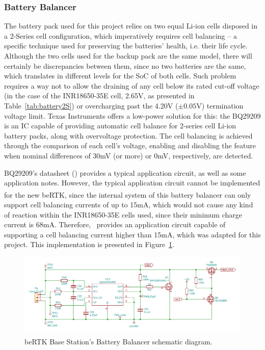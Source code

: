 \subsubsection{Battery Balancer}\label{sec:3212_BQ29209}

The battery pack used for this project relies on two equal Li-ion cells disposed in a 2-Series cell configuration, which imperatively requires cell balancing -- a specific technique used for preserving the batteries' health, i.e. their life cycle. Although the two cells used for the backup pack are the same model, there will certainly be discrepancies between them, since no two batteries are the same, which translates in different levels for the \gls{SoC} of both cells. Such problem requires a way not to allow the draining of any cell below its rated cut-off voltage (in the case of the INR18650-35E cell, 2.65V, as presented in Table~\ref{tab:battery2S}) or overcharging past the 4.20V ($\pm0.05$V) termination voltage limit. Texas Instruments offers a low-power solution for this: the BQ29209 is an IC capable of providing automatic cell balance for 2-series cell Li-ion battery packs, along with overvoltage protection. The cell balancing is achieved through the comparison of each cell's voltage, enabling and disabling the feature when nominal differences of 30mV (or more) or 0mV, respectively, are detected.

BQ29209's datasheet (\cite{bq29209}) provides a typical application circuit, as well as some application notes. However, the typical application circuit cannot be implemented for the new beRTK\textsuperscript{\textregistered}, since the internal system of this battery balancer can only support cell balancing currents of up to 15mA, which would not cause any kind of reaction within the INR18650-35E cells used, since their minimum charge current is 68mA. Therefore,~\cite{bq29209} provides an application circuit capable of supporting a cell balancing current higher than 15mA, which was adapted for this project. This implementation is presented in Figure~\ref{fig:BQ29209_circuit}. %

\begin{figure}[H]
    \centering
    \includegraphics[width=1.0\textwidth]{Chapters/Figures/chapter3/Battery_Balancer.pdf}
    \caption{beRTK\textsuperscript{\textregistered} Base Station's Battery Balancer schematic diagram.}
    \label{fig:BQ29209_circuit}
\end{figure}

